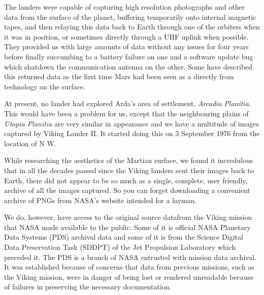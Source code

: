 The landers were capable of capturing high resolution photographs and other data from the surface of the planet, buffering temporarily onto internal magnetic tapes, and then relaying this data back to Earth through one of the orbiters when it was in position, or sometimes directly through a UHF uplink when possible. They provided us with large amounts of data without any issues for four years before finally succumbing to a battery failure on one and a software update bug which shutdown the communication antenna on the other. Some have described this returned data as the first time Mars had been seen as a  directly from technology on the surface.

At present, no lander had explored Arda's area of settlement, {\it Arcadia Planitia}. This would have been a problem for us, except that the neighbouring plains of {\it Utopia Planitia} are very similar in appearance and we have a multitude of images captured by Viking Lander II. It started doing this on 3 September 1976 from the location of N W.

    {}

\page
{}

While researching the aesthetics of the Martian surface, we found it incredulous that in all the decades passed since the Viking landers sent their images back to Earth, there did not appear to be so much as a single, complete, user friendly, archive of all the images captured. So you can forget downloading a convenient archive of PNGs from NASA's website intended for a layman.\footnotecite[grayzeck2008]

We do, however, have access to the original source data from the Viking mission that NASA made available to the public. Some of it is official NASA Planetary Data Systems (PDS) archival data and some of it is from the Science Digital Data Preservation Task (SDDPT) of the Jet Propulsion Laboratory which preceded it. The PDS is a branch of NASA entrusted with mission data archival. It was established because of concerns that data from previous missions, such as the Viking mission, were in danger of being lost or rendered unreadable because of failures in preserving the necessary documentation.
    {}

